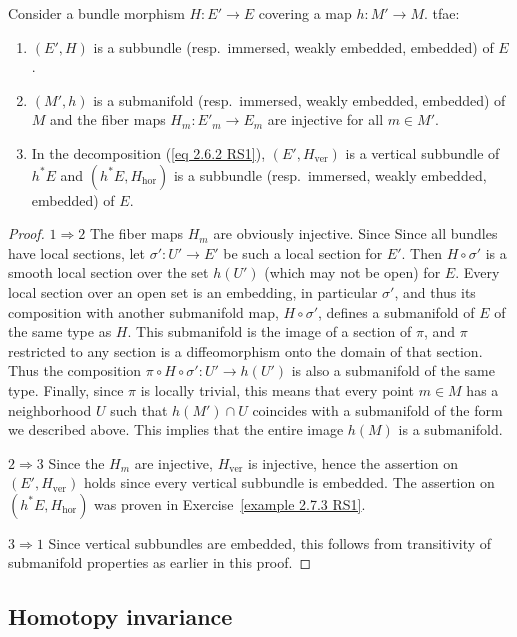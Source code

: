 \begin{prop}[{{\cite[Prop.~2.7.4]{RS1}}}]
    Consider a bundle morphism $H:E'\to E$ covering a map $h:M'\to M$.  \gls{tfae}:
    \begin{enumerate}
        \item $(E',H)$ is a subbundle (resp.~immersed, weakly embedded, embedded) of $E$.
        \item $(M',h)$ is a submanifold (resp.~immersed, weakly embedded, embedded) of $M$ and the fiber maps $H_m:E'_m\to E_m$ are injective for all $m\in M'$.
        \item In the decomposition (\ref{eq 2.6.2 RS1}), $(E',H_{\mathrm{ver}})$ is a vertical subbundle of $h^\ast E$ and $(h^\ast E,H_{\mathrm{hor}})$ is a subbundle (resp.~immersed, weakly embedded, embedded) of $E$.
    \end{enumerate}
\end{prop}
\begin{proof}
    $1\Rightarrow 2$ The fiber maps $H_m$ are obviously injective. Since Since all bundles have local sections, let $\sigma':U'\to E'$ be such a local section for $E'$. Then $H\circ\sigma'$ is a smooth local section over the set $h(U')$ (which may not be open) for $E$. Every local section over an open set is an embedding, in particular $\sigma'$, and thus its composition with another submanifold map, $H\circ \sigma'$, defines a submanifold of $E$ of the same type as $H$. This submanifold is the image of a section of $\pi$, and $\pi$ restricted to any section is a diffeomorphism onto the domain of that section. Thus the composition $\pi\circ H\circ \sigma':U'\to h(U')$ is also a submanifold of the same type. Finally, since $\pi$ is locally trivial, this means that every point $m\in M$ has a neighborhood $U$ such that $h(M')\cap U$ coincides with a submanifold of the form we described above. This implies that the entire image $h(M)$ is a submanifold.
    
    $2\Rightarrow 3$ Since the $H_m$ are injective, $H_{\mathrm{ver}}$ is injective, hence the assertion on $(E',H_{\mathrm{ver}})$ holds since every vertical subbundle is embedded. The assertion on $(h^\ast E,H_{\mathrm{hor}})$ was proven in Exercise~\ref{example 2.7.3 RS1}.

    $3\Rightarrow 1$ Since vertical subbundles are embedded, this follows from transitivity of submanifold properties as earlier in this proof.
\end{proof}




\subsection{Homotopy invariance}


